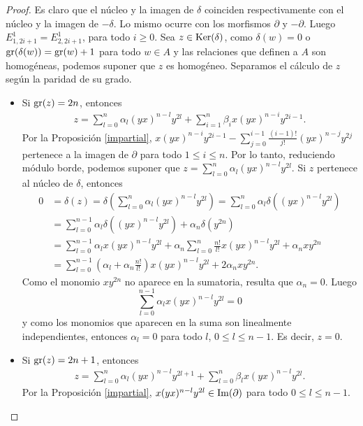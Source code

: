 \documentclass[fleqn,../tesis.tex]{subfiles}
\begin{document}
\begin{proof}
	Es claro que el núcleo y la imagen de $\delta$ coinciden respectivamente con el núcleo
	y la imagen de $-\delta$. Lo mismo ocurre con los morfismos
	$\partial$ y $-\partial$. Luego $E_{1,2i + 1}^1 = E_{2, 2i + 1}^1$, para todo $i \geq 0$.
	Sea $z \in \operatorname{Ker}(\delta)$, como $\delta(w) = 0$ o $\operatorname{gr}(\delta(w)) = \operatorname{gr}(w) + 1$ para todo $w \in A$
	y las relaciones que definen a $A$ son homogéneas, podemos suponer que $z$ es homogéneo.
	Separamos el cálculo de $z$ según la paridad de su grado.
	\begin{itemize}
		\item Si $\operatorname{gr}(z) = 2n$, entonces
		\begin{align*}
			z = \sum_{l = 0}^n\alpha_l(yx)^{n - l}y^{2l} + \sum_{i = 1}^n\beta_ix(yx)^{n - i}y^{2i - 1}.
		\end{align*}
		Por la Proposición \ref{impartial}, $x(yx)^{n - i}y^{2i - 1} - \sum_{j = 0}^{i - 1}\frac{(i-1)!}{j!}(yx)^{n - j}y^{2j}$
		pertenece a la imagen de $\partial$ para todo $1 \leq i \leq n$.
		Por lo tanto, reduciendo módulo borde, podemos suponer que $z = \sum_{l = 0}^n\alpha_l(yx)^{n - l}y^{2l}$.
		Si $z$ pertenece al núcleo de $\delta$, entonces
		\begin{align*}
			0 &= \delta(z) = \delta\left(\sum_{l = 0}^n\alpha_l(yx)^{n - l}y^{2l}\right) = \sum_{l = 0}^n\alpha_l\delta((yx)^{n - l}y^{2l}) \\
			&= \sum_{l = 0}^{n - 1}\alpha_l\delta((yx)^{n - l}y^{2l}) + \alpha_n\delta(y^{2n}) \\
				&= \sum_{l = 0}^{n - 1}\alpha_lx(yx)^{n - l}y^{2l} + \alpha_n\sum_{l = 0}^n \frac{n!}{l!}x(yx)^{n - l}y^{2l} + \alpha_nxy^{2n} \\
				&= \sum_{l = 0}^{n - 1}(\alpha_l + \alpha_n\frac{n!}{l!}) x(yx)^{n - l}y^{2l} + 2\alpha_nxy^{2n}.
		\end{align*}	
		Como el monomio $xy^{2n}$ no aparece en la sumatoria, resulta que $\alpha_n = 0$.
		Luego
		\[
			\sum_{l = 0}^{n - 1}\alpha_lx(yx)^{n - l}y^{2l} = 0
		\]
		y como los monomios que aparecen en la suma son linealmente independientes, entonces $\alpha_l = 0$ para todo $l$, $0 \leq l \leq n -1$.
		Es decir, $z = 0$.
		\item Si $\operatorname{gr}(z) = 2n + 1$, entonces
		\begin{align*}
			z = \sum_{l = 0}^n\alpha_l(yx)^{n - l}y^{2l + 1} + \sum_{l = 0}^n\beta_lx(yx)^{n - l}y^{2l}.
		\end{align*}
		Por la Proposición \ref{impartial}, $x(yx)^{n - l}y^{2l} \in \operatorname{Im}(\partial)$ para todo $0 \leq l \leq n - 1$.

\end{itemize}
\end{proof}
\end{document}
